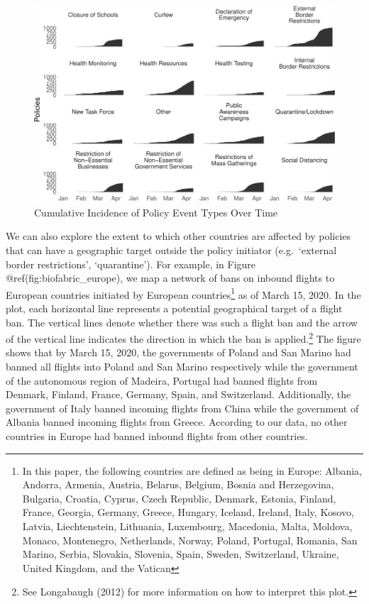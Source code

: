 \documentclass[]{article}
\let\rmarkdownfootnote\footnote%
\def\footnote{\protect\rmarkdownfootnote}
\begin{document}
\begin{figure}
\centering
\includegraphics{corona_wp_files/figure-latex/overtime-1.pdf}
\caption{\label{fig:overtime}Cumulative Incidence of Policy Event Types Over Time}
\end{figure}

We can also explore the extent to which other countries are affected by policies that can have a geographic target outside the policy initiator (e.g.~`external border restrictions', `quarantine'). For example, in Figure @ref(fig:biofabric\_europe), we map a network of bans on inbound flights to European countries initiated by European countries\footnote{In this paper, the following countries are defined as being in Europe: Albania, Andorra, Armenia, Austria, Belarus, Belgium, Bosnia and Herzegovina, Bulgaria, Croatia, Cyprus, Czech Republic, Denmark, Estonia, Finland, France, Georgia, Germany, Greece, Hungary, Iceland, Ireland, Italy, Kosovo, Latvia, Liechtenstein, Lithuania, Luxembourg, Macedonia, Malta, Moldova, Monaco, Montenegro, Netherlands, Norway, Poland, Portugal, Romania, San Marino, Serbia, Slovakia, Slovenia, Spain, Sweden, Switzerland, Ukraine, United Kingdom, and the Vatican} as of March 15, 2020. In the plot, each horizontal line represents a potential geographical target of a flight ban. The vertical lines denote whether there was such a flight ban and the arrow of the vertical line indicates the direction in which the ban is applied.\footnote{See Longabaugh (2012) for more information on how to interpret this plot. } The figure shows that by March 15, 2020, the governments of Poland and San Marino had banned all flights into Poland and San Marino respectively while the government of the autonomous region of Madeira, Portugal had banned flights from Denmark, Finland, France, Germany, Spain, and Switzerland. Additionally, the government of Italy banned incoming flights from China while the government of Albania banned incoming flights from Greece. According to our data, no other countries in Europe had banned inbound flights from other countries.
\end{document}
